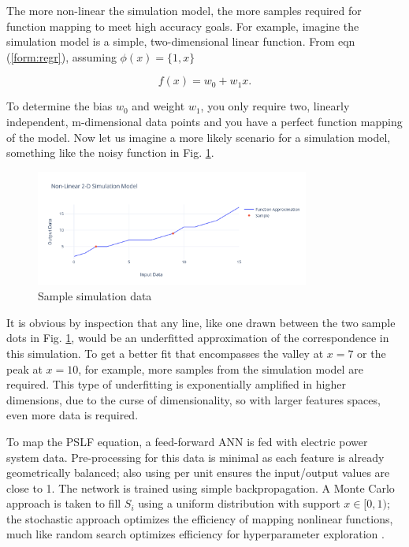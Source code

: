\documentclass[conference]{IEEEtran}
\begin{document}
The more non-linear the simulation model, the more samples required for function mapping to meet high accuracy goals. For example, imagine the simulation model is a simple, two-dimensional linear function. From eqn (\ref{form:regr}), assuming $\phi(x) = \{1, x\}$

\begin{equation} f(x) = w_{0} + w_{1} x. \label{form: line} \end{equation}

To determine the bias $w_{0}$ and weight $w_{1}$, you only require two, linearly independent, m-dimensional data points and you have a perfect function mapping of the model. Now let us imagine a more likely scenario for a simulation model,  something like the noisy function in Fig. \ref{fig:simdata}.

\begin{figure}[H]
	\centering
	\includegraphics[width=9cm]{simdata.pdf}
	\caption{Sample simulation data}
	\label{fig:simdata}
\end{figure}

It is obvious by inspection that any line, like one drawn between the two sample dots in Fig. \ref{fig:simdata}, would be an underfitted approximation of the correspondence in this simulation. To get a better fit that encompasses the valley at $x = 7$ or the peak at $x  =10$, for example, more samples from the simulation model are required. This type of underfitting is exponentially amplified in higher dimensions, due to the curse of dimensionality, so with larger features spaces, even more data is required.

To map the PSLF equation, a feed-forward ANN is fed with electric power system data. Pre-processing for this data is minimal as each feature is already geometrically balanced; also using per unit ensures the input/output values are close to 1. The network is trained using simple backpropagation. A Monte Carlo approach is taken to fill $S_{i}$ using a uniform distribution with support $x \in [0, 1)$; the stochastic approach optimizes the efficiency of mapping nonlinear functions, much like random search optimizes efficiency for hyperparameter exploration \cite{berg2012}.
\end{document}
